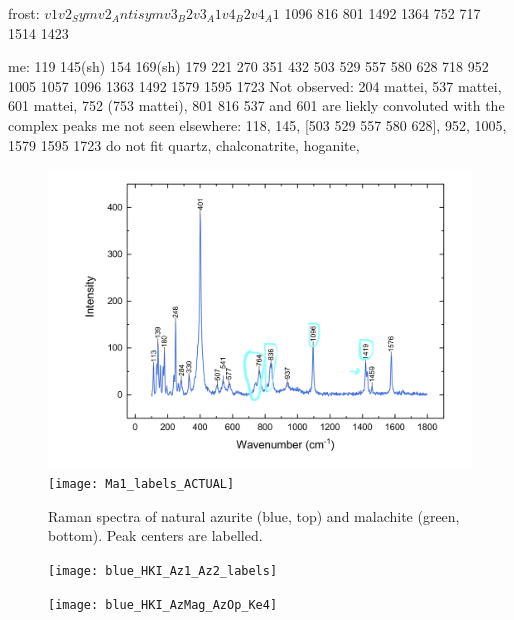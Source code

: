 frost: $v1    v2_Sym  v2_Antisym   v3_B2   v3_A1    v4_B2   v4_A1$
      1096     816      801       1492     1364     752     717
                                  1514     1423

me: 119 145(sh) 154 169(sh) 179 221 270 351 432 503 529 557 580 628 718 952 1005 1057 1096 1363 1492 1579 1595 1723
Not observed: 204 mattei, 537 mattei, 601 mattei, 752 (753 mattei), 801 816
537 and 601 are liekly convoluted with the complex peaks
me not seen elsewhere: 118, 145, [503 529 557 580 628], 952, 1005, 1579 1595 1723
do not fit quartz, chalconatrite, hoganite, 





\begin{figure}[H]
\centering
\begin{minipage}[t]{\linewidth}
  \centering
  \includegraphics[width=0.9\linewidth]{az1_blue_withlabels}
\hfill
\texttt{[image: Ma1\_labels\_ACTUAL]}
\hfill
\end{minipage}
\caption[Raman spectra of natural azurite and malachite, peak centers labelled.]{Raman spectra of natural azurite (blue, top) and malachite (green, bottom). Peak centers are labelled.}
\label{fig:label_raman}
\end{figure}

\begin{figure}[H]
\centering
  \texttt{[image: blue\_HKI\_Az1\_Az2\_labels]}
\label{fig:blue_comparison1}
\end{figure}

\begin{figure}[H]
  \centering
  \texttt{[image: blue\_HKI\_AzMag\_AzOp\_Ke4]}
\label{fig:blue_comparison2}
\end{figure}

